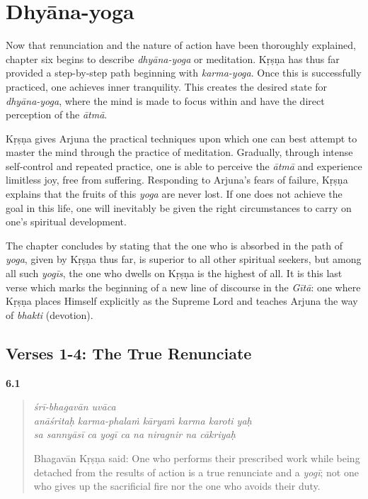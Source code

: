 \chapter{Dhyāna-yoga}\label{chap-dhyana-yoga}

\noindent Now that renunciation and the nature of action have been thoroughly explained, chapter six begins to describe \textit{dhyāna-yoga} or meditation. Kṛṣṇa has thus far provided a step-by-step path beginning with \textit{karma-yoga}. Once this is successfully practiced, one achieves inner tranquility. This creates the desired state for \textit{dhyāna-yoga}, where the mind is made to focus within and have the direct perception of the \textit{ātmā}.

Kṛṣṇa gives Arjuna the practical techniques upon which one can best attempt to master the mind through the practice of meditation. Gradually, through intense self-control and repeated practice, one is able to perceive the \textit{ātmā} and experience limitless joy, free from suffering. Responding to Arjuna’s fears of failure, Kṛṣṇa explains that the fruits of this \textit{yoga} are never lost. If one does not achieve the goal in this life, one will inevitably be given the right circumstances to carry on one’s spiritual development.

The chapter concludes by stating that the one who is absorbed in the path of \textit{yoga}, given by Kṛṣṇa thus far, is superior to all other spiritual seekers, but among all such \textit{yogīs}, the one who dwells on Kṛṣṇa is the highest of all. It is this last verse which marks the beginning of a new line of discourse in the \textit{Gītā}: one where Kṛṣṇa places Himself explicitly as the Supreme Lord and teaches Arjuna the way of \textit{bhakti} (devotion).

\section{Verses 1-4: The True Renunciate}\label{sec-verses-1-4-the-true-renunciate}


\par\noindent\textbf{6.1}\par
\begin{verse}
\textit{śrī-bhagavān uvāca} \\
\textit{anāśritaḥ karma-phalaṁ kāryaṁ karma karoti yaḥ} \\
\textit{sa sannyāsī ca yogī ca na niragnir na cākriyaḥ}

\noindent Bhagavān Kṛṣṇa said: One who performs their prescribed work while being detached from the results of action is a true renunciate and a \textit{yogī}; not one who gives up the sacrificial fire nor the one who avoids their duty.
\end{verse}
\par



